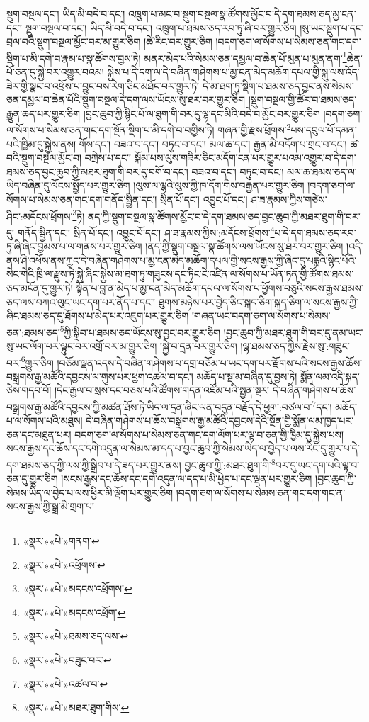 སྡུག་བསྔལ་དང་། ཡིད་མི་བདེ་བ་དང་། འཁྲུག་པ་མང་བ་སྡུག་བསྔལ་སྣ་ཚོགས་མྱོང་བ་དེ་དག་ཐམས་ཅད་མྱ་ངན་དང་། སྡུག་བསྔལ་བ་དང་། ཡིད་མི་བདེ་བ་དང་། འཁྲུག་པ་ཐམས་ཅད་རབ་ཏུ་ཞི་བར་གྱུར་ཅིག །སུ་ཡང་སྡུག་པ་དང་བྲལ་བའི་སྡུག་བསྔལ་མྱོང་བར་མ་གྱུར་ཅིག །ཚེ་རིང་བར་གྱུར་ཅིག །བདག་ཅག་ལ་སོགས་པ་སེམས་ཅན་གང་དག་སྡིག་པ་མི་དགེ་བ་རྣམ་པ་སྣ་ཚོགས་བྱས་ཏེ། མནར་མེད་པའི་སེམས་ཅན་དམྱལ་བ་ཆེན་པོ་མུན་པ་མུན་ནག་\footnote{«སྣར་»«པེ་»གནག་}ཆེན་པོ་ཅན་དུ་སྐྱེ་བར་འགྱུར་བའམ། སྐྱེས་པ་དེ་དག་ལ་དེ་བཞིན་གཤེགས་པ་མྱ་ངན་མེད་མཆོག་དཔལ་གྱི་སྐུ་ལས་འོད་ཟེར་གྱི་སྣང་བ་འཕྲོས་པ་བྱུང་བས་རེག་ཅིང་མཐོང་བར་གྱུར་ཏེ། དེ་མ་ཐག་ཏུ་སྡིག་པ་ཐམས་ཅད་བྱང་ནས་སེམས་ཅན་དམྱལ་བ་ཆེན་པོའི་སྡུག་བསྔལ་དེ་དག་ལས་ཡོངས་སུ་ཐར་བར་གྱུར་ཅིག །སྡུག་བསྔལ་གྱི་ཚོར་བ་ཐམས་ཅད་རྒྱུན་ཆད་པར་གྱུར་ཅིག །བྱང་ཆུབ་ཀྱི་སྙིང་པོ་ལ་ཐུག་གི་བར་དུ་ལྷ་དང་མིའི་བདེ་བ་མྱོང་བར་གྱུར་ཅིག །བདག་ཅག་ལ་སོགས་པ་སེམས་ཅན་གང་དག་སྔོན་སྡིག་པ་མི་དགེ་བ་བགྱིས་ཏེ། གཞན་གྱི་རྫས་ཕྲོགས་\footnote{«སྣར་»«པེ་»འཕྲོགས་}པས་དབུལ་པོ་དམན་པའི་ཁྱིམ་དུ་སྐྱེས་ནས། གོས་དང་། བཟའ་བ་དང་། བཏུང་བ་དང་། མལ་ཆ་དང་། རྒྱན་མི་བདོག་པ་གྲང་བ་དང་། ཚ་བའི་སྡུག་བསྔལ་མྱོང་བ། བཀྲེས་པ་དང་། སྐོམ་པས་ལུས་གཟིར་ཅིང་མདོག་ངན་པར་གྱུར་པའམ་འགྱུར་བ་དེ་དག་ཐམས་ཅད་བྱང་ཆུབ་ཀྱི་མཐར་ཐུག་གི་བར་དུ་བགོ་བ་དང་། བཟའ་བ་དང་། བཏུང་བ་དང་། མལ་ཆ་ཐམས་ཅད་ལ་ཡིད་བཞིན་དུ་ལོངས་སྤྱོད་པར་གྱུར་ཅིག །ལུས་ལ་ལྷའི་ལུས་ཀྱི་ཁ་དོག་གིས་བརྒྱན་པར་གྱུར་ཅིག །བདག་ཅག་ལ་སོགས་པ་སེམས་ཅན་གང་དག་གནོད་སྦྱིན་དང་། སྲིན་པོ་དང་། འབྱུང་པོ་དང་། ཤ་ཟ་རྣམས་ཀྱིས་གཙེས་ཤིང་:མདོངས་ཕྲོགས་\footnote{«སྣར་»«པེ་»མདངས་འཕྲོགས་}ཏེ། ནད་ཀྱི་སྡུག་བསྔལ་སྣ་ཚོགས་མྱོང་བ་དེ་དག་ཐམས་ཅད་བྱང་ཆུབ་ཀྱི་མཐར་ཐུག་གི་བར་དུ། གནོད་སྦྱིན་དང་། སྲིན་པོ་དང་། འབྱུང་པོ་དང་། ཤ་ཟ་རྣམས་ཀྱིས་:མདོངས་ཕྲོགས་\footnote{«སྣར་»«པེ་»མདངས་འཕྲོག་}པ་དེ་དག་ཐམས་ཅད་རབ་ཏུ་ཞི་ཞིང་བྱམས་པ་ལ་གནས་པར་གྱུར་ཅིག །ནད་ཀྱི་སྡུག་བསྔལ་སྣ་ཚོགས་ལས་ཡོངས་སུ་ཐར་བར་གྱུར་ཅིག །འདི་ནས་ཤི་འཕོས་ནས་ཀྱང་དེ་བཞིན་གཤེགས་པ་མྱ་ངན་མེད་མཆོག་དཔལ་གྱི་སངས་རྒྱས་ཀྱི་ཞིང་དུ་པདྨའི་སྙིང་པོའི་སེང་གེའི་ཁྲི་ལ་རྫུས་ཏེ་སྐྱེ་ཞིང་སྐྱེས་མ་ཐག་ཏུ་གཟུངས་དང་ཏིང་ངེ་འཛིན་ལ་སོགས་པ་ཡོན་ཏན་གྱི་ཚོགས་ཐམས་ཅད་མངོན་དུ་གྱུར་ཏེ། སྟོན་པ་བླ་ན་མེད་པ་མྱ་ངན་མེད་མཆོག་དཔལ་ལ་སོགས་པ་ཕྱོགས་བཅུའི་སངས་རྒྱས་ཐམས་ཅད་ལས་བཀའ་ལུང་ཡང་དག་པར་ནོད་པ་དང་། ཐུགས་མཉེས་པར་བྱེད་ཅིང་སྐད་ཅིག་སྐད་ཅིག་ལ་སངས་རྒྱས་ཀྱི་ཞིང་ཐམས་ཅད་དུ་ཐོགས་པ་མེད་པར་འཇུག་པར་གྱུར་ཅིག །གཞན་ཡང་བདག་ཅག་ལ་སོགས་པ་སེམས་ཅན་:ཐམས་ཅད་\footnote{«སྣར་»«པེ་»ཐམས་ཅད་ལས་}ཀྱི་སྒྲིབ་པ་ཐམས་ཅད་ཡོངས་སུ་བྱང་བར་གྱུར་ཅིག །བྱང་ཆུབ་ཀྱི་མཐར་ཐུག་གི་བར་དུ་ནམ་ཡང་སུ་ཡང་ལོག་པར་ལྟུང་བར་འགྲོ་བར་མ་གྱུར་ཅིག །སྐྱེ་བ་དྲན་པར་གྱུར་ཅིག །ལྷ་ཐམས་ཅད་ཀྱིས་རྗེས་སུ་:གཟུང་བར་\footnote{«སྣར་»«པེ་»བཟུང་བར་}གྱུར་ཅིག །བཅོམ་ལྡན་འདས་དེ་བཞིན་གཤེགས་པ་དགྲ་བཅོམ་པ་ཡང་དག་པར་རྫོགས་པའི་སངས་རྒྱས་ཆོས་བསྒྲགས་རྒྱ་མཚོའི་དབྱངས་ལ་གུས་པར་ཕྱག་འཚལ་བ་དང་། མཆོད་པ་སྔ་མ་བཞིན་དུ་བྱས་ཏེ། སྨོན་ལམ་འདི་སྐད་ཅེས་གདབ་བོ། །དེང་རྒྱལ་བ་སྲས་དང་བཅས་པའི་ཚོགས་གདན་འཛོམ་པའི་སྤྱན་སྔར། དེ་བཞིན་གཤེགས་པ་ཆོས་བསྒྲགས་རྒྱ་མཚོའི་དབྱངས་ཀྱི་མཚན་ཐོས་ཏེ་ཡིད་ལ་དྲན་ཞིང་ལན་བདུན་བརྗོད་དེ་ཕྱག་:བཙལ་བ་\footnote{«སྣར་»«པེ་»འཚལ་བ་}དང་། མཆོད་པ་ལ་སོགས་པའི་མཐུས། དེ་བཞིན་གཤེགས་པ་ཆོས་བསྒྲགས་རྒྱ་མཚོའི་དབྱངས་དེའི་སྔོན་གྱི་སྨོན་ལམ་ཁྱད་པར་ཅན་དང་མཐུན་པར། བདག་ཅག་ལ་སོགས་པ་སེམས་ཅན་གང་དག་ལོག་པར་ལྟ་བ་ཅན་གྱི་ཁྱིམ་དུ་སྐྱེས་པས། སངས་རྒྱས་དང་ཆོས་དང་དགེ་འདུན་ལ་སེམས་མ་དད་པ་བྱང་ཆུབ་ཀྱི་སེམས་ཡིད་ལ་བྱེད་པ་ལས་རིང་དུ་གྱུར་པ་དེ་དག་ཐམས་ཅད་ཀྱི་ལས་ཀྱི་སྒྲིབ་པ་དེ་ཟད་པར་གྱུར་ནས། བྱང་ཆུབ་ཀྱི་:མཐར་ཐུག་གི་\footnote{«སྣར་»«པེ་»མཐར་ཐུག་གིས་}བར་དུ་ཡང་དག་པའི་ལྟ་བ་ཅན་དུ་གྱུར་ཅིག །སངས་རྒྱས་དང་ཆོས་དང་དགེ་འདུན་ལ་དད་པ་མི་ཕྱེད་པ་དང་ལྡན་པར་གྱུར་ཅིག །བྱང་ཆུབ་ཀྱི་སེམས་ཡིད་ལ་བྱེད་པ་ལས་ཕྱིར་མི་ལྡོག་པར་གྱུར་ཅིག །བདག་ཅག་ལ་སོགས་པ་སེམས་ཅན་གང་དག་གང་ན་སངས་རྒྱས་ཀྱི་སྒྲ་མི་གྲག་པ། 